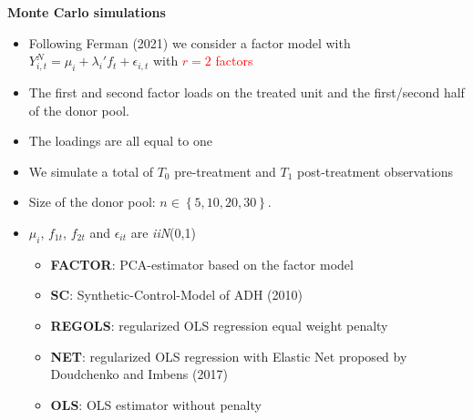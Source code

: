 \documentclass{beamer}
\newcommand{\red}[1]{\textcolor{red}{#1}}
\begin{document}
\begin{frame}{\bf Monte Carlo simulations}

\begin{itemize}
\item Following Ferman (2021) we consider a factor model with $Y_{i,t}^{N} = \mu_i + \lambda_i'f_t + \epsilon_{i,t}$ with \red{$r=2$ factors}
\item The first and second factor loads on the treated unit and the first/second half of the donor pool.
\item The loadings are all equal to one
\item We simulate a total of $T_0$ pre-treatment and $T_1$ post-treatment observations
\item Size of the donor pool: $n \in \left\lbrace 5,10,20,30\right\rbrace$.
\item $\mu_i$, $f_{1t}$, $f_{2t}$ and $\epsilon_{it}$ are \textit{iiN}(0,1) \smallskip

{\footnotesize \begin{itemize}
\item {\bf FACTOR}: PCA-estimator based on the factor model
\item {\bf SC}: Synthetic-Control-Model of ADH (2010)
\item {\bf REGOLS}: regularized OLS regression equal weight penalty
\item {\bf NET}: regularized OLS regression with Elastic Net proposed by Doudchenko and Imbens (2017)
\item {\bf OLS}: OLS estimator without penalty
\end{itemize} }
\end{itemize}
\end{frame}
\end{document}
